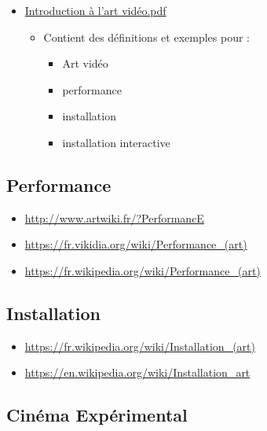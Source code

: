 \documentclass[
  french,
]{book}
\providecommand{\tightlist}{%
  \setlength{\itemsep}{0pt}\setlength{\parskip}{0pt}}
\begin{document}
\begin{itemize}
\tightlist
\item
  \href{https://www.lerecit.fr/wp-content/uploads/2017/08/introduction-\%C3\%A0-lArt-Vid\%C3\%A9o.pdf}{Introduction à l'art vidéo.pdf}

  \begin{itemize}
  \tightlist
  \item
    Contient des définitions et exemples pour :

    \begin{itemize}
    \tightlist
    \item
      Art vidéo
    \item
      performance
    \item
      installation
    \item
      installation interactive
    \end{itemize}
  \end{itemize}
\end{itemize}

\hypertarget{evolution_historique_performance}{%
\subsection{Performance}\label{evolution_historique_performance}}

\begin{itemize}
\tightlist
\item
  \url{http://www.artwiki.fr/?PerformancE}
\item
  \url{https://fr.vikidia.org/wiki/Performance_(art)}
\item
  \url{https://fr.wikipedia.org/wiki/Performance_(art)}
\end{itemize}

\hypertarget{evolution_historique_installation}{%
\subsection{Installation}\label{evolution_historique_installation}}

\begin{itemize}
\tightlist
\item
  \url{https://fr.wikipedia.org/wiki/Installation_(art)}
\item
  \url{https://en.wikipedia.org/wiki/Installation_art}
\end{itemize}

\hypertarget{cinuxe9ma-expuxe9rimental}{%
\subsection{Cinéma Expérimental}\label{cinuxe9ma-expuxe9rimental}}
\end{document}
